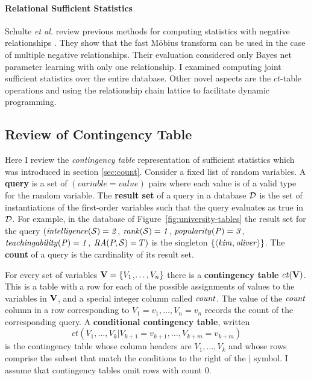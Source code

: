 \documentclass{sfuthesis}
\newcommand{\ct}{\mathit{ct}}
\begin{document}
\paragraph{Relational Sufficient Statistics} 
Schulte {\em et al.} review previous methods for computing statistics with negative relationships \cite{Schulte2014}. They show that the fast M\"obius transform can be used in the case of multiple negative relationships. Their evaluation considered only Bayes net parameter learning with only one relationship. I  examined computing joint sufficient statistics over the entire database.  Other novel aspects are the $\ct$-table operations and using the relationship chain lattice to facilitate dynamic programming. 



\subsection{Review of Contingency Table}

Here I review the {\em contingency table}  representation of sufficient statistics  which was introduced in section \ref{sec:count}. 
Consider a fixed list of  random variables. A \textbf{query} is a set of $(variable = value)$ pairs where each value is of a valid type for the random variable. 
The \textbf{result set} of a query in a database $\D$ is the set of instantiations of the first-order variables such that the query evaluates as true in $\D$. For example, in the database of Figure~\ref{fig:university-tables} the result set for the query 
$(\it{intelligence}(\S) = 2$, $\it{rank}(\S) = 1$, $\it{popularity}(\P) = 3$, $\it{teachingability}(\P) = 1$, $\ra(\P,\S) = T)$ is the singleton $\{\langle \it{kim}, \it{oliver}\rangle\}$. The \textbf{count} of a query is the cardinality of its result set. 

For every set of variables $\set{V} = \{\V_{1}$,$\ldots,\V_{n} \}$ there is a \textbf{contingency table} $\ct(\set{V})$. %
This is a table with a row for each of the possible assignments of values to the variables in $\set{V}$, and a special integer column called $\qcount$. The value of the $\qcount$ column in a row corresponding to $V_{1} = v_{1},\ldots,V_{n} = v_{n}$ records the count of the corresponding query. 
A \textbf{conditional contingency table}, written $$\ct(V_{1},\ldots,V_{k}|V_{k+1} = v_{k+1},\ldots, V_{k+m} = v_{k+m})$$
is the contingency table whose column headers are $V_{1},\ldots,V_{k}$ and whose rows comprise the subset that match the conditions to the right of the $\vert$ symbol.    
I  assume that contingency tables omit rows with count 0.
\end{document}
